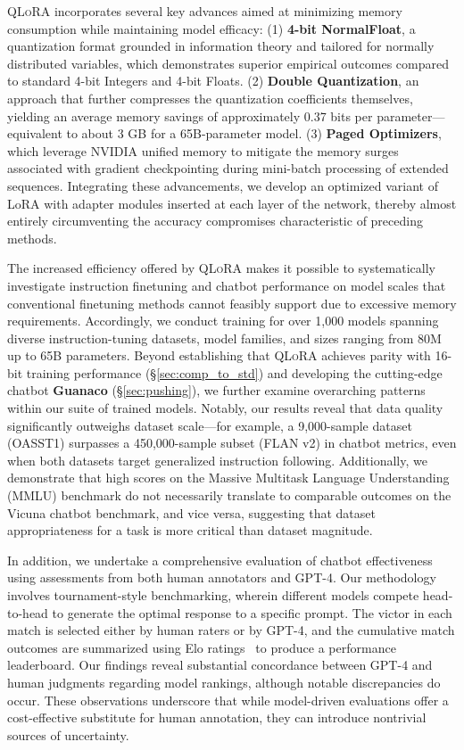 \textsc{QLoRA} incorporates several key advances aimed at minimizing memory consumption while maintaining model efficacy: (1) \textbf{4-bit NormalFloat}, a quantization format grounded in information theory and tailored for normally distributed variables, which demonstrates superior empirical outcomes compared to standard 4-bit Integers and 4-bit Floats. (2) \textbf{Double Quantization}, an approach that further compresses the quantization coefficients themselves, yielding an average memory savings of approximately 0.37 bits per parameter—equivalent to about 3 GB for a 65B-parameter model. (3) \textbf{Paged Optimizers}, which leverage NVIDIA unified memory to mitigate the memory surges associated with gradient checkpointing during mini-batch processing of extended sequences. Integrating these advancements, we develop an optimized variant of LoRA with adapter modules inserted at each layer of the network, thereby almost entirely circumventing the accuracy compromises characteristic of preceding methods.

The increased efficiency offered by \textsc{QLoRA} makes it possible to systematically investigate instruction finetuning and chatbot performance on model scales that conventional finetuning methods cannot feasibly support due to excessive memory requirements. Accordingly, we conduct training for over 1,000 models spanning diverse instruction-tuning datasets, model families, and sizes ranging from 80M up to 65B parameters. Beyond establishing that \textsc{QLoRA} achieves parity with 16-bit training performance (\S\ref{sec:comp_to_std}) and developing the cutting-edge chatbot \textbf{Guanaco} (\S\ref{sec:pushing}), we further examine overarching patterns within our suite of trained models. Notably, our results reveal that data quality significantly outweighs dataset scale—for example, a 9,000-sample dataset (OASST1) surpasses a 450,000-sample subset (FLAN v2) in chatbot metrics, even when both datasets target generalized instruction following. Additionally, we demonstrate that high scores on the Massive Multitask Language Understanding (MMLU) benchmark do not necessarily translate to comparable outcomes on the Vicuna chatbot benchmark, and vice versa, suggesting that dataset appropriateness for a task is more critical than dataset magnitude.

In addition, we undertake a comprehensive evaluation of chatbot effectiveness using assessments from both human annotators and GPT-4. Our methodology involves tournament-style benchmarking, wherein different models compete head-to-head to generate the optimal response to a specific prompt. The victor in each match is selected either by human raters or by GPT-4, and the cumulative match outcomes are summarized using Elo ratings~\citep{elo1967proposed, elo1978rating} to produce a performance leaderboard. Our findings reveal substantial concordance between GPT-4 and human judgments regarding model rankings, although notable discrepancies do occur. These observations underscore that while model-driven evaluations offer a cost-effective substitute for human annotation, they can introduce nontrivial sources of uncertainty.

